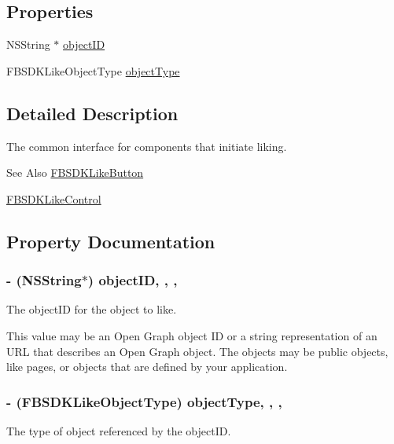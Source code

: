 \subsection*{Properties}
\begin{DoxyCompactItemize}
\item 
N\-S\-String $\ast$ \hyperlink{protocol_f_b_s_d_k_liking-p_ae1fb9b5b4792c73a336120f8101574b5}{object\-I\-D}
\item 
F\-B\-S\-D\-K\-Like\-Object\-Type \hyperlink{protocol_f_b_s_d_k_liking-p_a7e888287a80f5cc50af1d423e37f3cda}{object\-Type}
\end{DoxyCompactItemize}


\subsection{Detailed Description}
The common interface for components that initiate liking. \begin{DoxySeeAlso}{See Also}
\hyperlink{interface_f_b_s_d_k_like_button}{F\-B\-S\-D\-K\-Like\-Button} 

\hyperlink{interface_f_b_s_d_k_like_control}{F\-B\-S\-D\-K\-Like\-Control} 
\end{DoxySeeAlso}


\subsection{Property Documentation}
\hypertarget{protocol_f_b_s_d_k_liking-p_ae1fb9b5b4792c73a336120f8101574b5}{
\subsubsection[{object\-I\-D}]{\setlength{\rightskip}{0pt plus 5cm}-\/ (N\-S\-String$\ast$) object\-I\-D\hspace{0.3cm}{\ttfamily [read]}, {\ttfamily [write]}, {\ttfamily [nonatomic]}, {\ttfamily [copy]}}}\label{protocol_f_b_s_d_k_liking-p_ae1fb9b5b4792c73a336120f8101574b5}
The object\-I\-D for the object to like.

This value may be an Open Graph object I\-D or a string representation of an U\-R\-L that describes an Open Graph object. The objects may be public objects, like pages, or objects that are defined by your application. \hypertarget{protocol_f_b_s_d_k_liking-p_a7e888287a80f5cc50af1d423e37f3cda}{
\subsubsection[{object\-Type}]{\setlength{\rightskip}{0pt plus 5cm}-\/ (F\-B\-S\-D\-K\-Like\-Object\-Type) object\-Type\hspace{0.3cm}{\ttfamily [read]}, {\ttfamily [write]}, {\ttfamily [nonatomic]}, {\ttfamily [assign]}}}\label{protocol_f_b_s_d_k_liking-p_a7e888287a80f5cc50af1d423e37f3cda}
The type of object referenced by the object\-I\-D.

